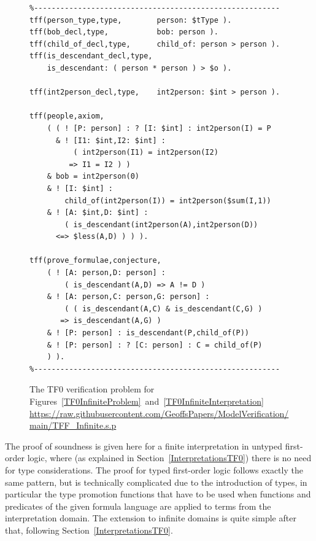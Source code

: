 \documentclass[letterpaper]{article}
\begin{document}
\begin{figure}[htbp]
\scriptsize
{}
\begin{verbatim}
%--------------------------------------------------------
tff(person_type,type,        person: $tType ).
tff(bob_decl,type,           bob: person ).
tff(child_of_decl,type,      child_of: person > person ).
tff(is_descendant_decl,type, 
    is_descendant: ( person * person ) > $o ).

tff(int2person_decl,type,    int2person: $int > person ).

tff(people,axiom,
    ( ( ! [P: person] : ? [I: $int] : int2person(I) = P
      & ! [I1: $int,I2: $int] : 
          ( int2person(I1) = int2person(I2) 
         => I1 = I2 ) )
    & bob = int2person(0)
    & ! [I: $int] : 
        child_of(int2person(I)) = int2person($sum(I,1))
    & ! [A: $int,D: $int] : 
        ( is_descendant(int2person(A),int2person(D)) 
      <=> $less(A,D) ) ) ).

tff(prove_formulae,conjecture,
    ( ! [A: person,D: person] : 
        ( is_descendant(A,D) => A != D )
    & ! [A: person,C: person,G: person] :
        ( ( is_descendant(A,C) & is_descendant(C,G) )
       => is_descendant(A,G) )
    & ! [P: person] : is_descendant(P,child_of(P))
    & ! [P: person] : ? [C: person] : C = child_of(P) 
    ) ).
%--------------------------------------------------------
\end{verbatim}
\caption{The TF0 verification problem for 
Figures~\ref{TF0InfiniteProblem}~and~\ref{TF0InfiniteInterpretation}\\
{\scriptsize \url{https://raw.githubusercontent.com/GeoffsPapers/ModelVerification/main/TFF_Infinite.s.p}}}
\label{TF0InfiniteVerification}
\end{figure}

The proof of soundness is given here for a finite interpretation in untyped first-order logic, 
where (as explained in Section~\ref{InterpretationsTF0}) there is no need for type considerations.
The proof for typed first-order logic follows exactly the same pattern, but is technically
complicated due to the introduction of types, in particular the type promotion functions that have 
to be used when functions and predicates of the given formula language are applied to terms from 
the interpretation domain.
The extension to infinite domains is quite simple after that, following 
Section~\ref{InterpretationsTF0}.
\end{document}
